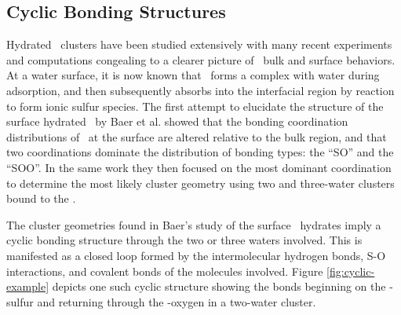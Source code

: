 \subsection {Cyclic Bonding Structures}

Hydrated \suldiox~clusters have been studied extensively with many recent experiments and computations congealing to a clearer picture of \suldiox~bulk and surface behaviors.\cite{Baer2010, Tarbuck2005, Tarbuck2006, Ota2011, Bishenden1998, Hirabayashi2006, Steudel2009, Yang2002, Hayashi1985, Moin2011, Eckl2008} At a water surface, it is now known that \suldiox~forms a complex with water during adsorption, and then subsequently absorbs into the interfacial region by reaction to form ionic sulfur species.\cite{Tarbuck2005, Tarbuck2006, Ota2011} The first attempt to elucidate the structure of the surface hydrated \suldiox~by Baer et al. showed that the bonding coordination distributions of \suldiox~at the surface are altered relative to the bulk region, and that two coordinations dominate the distribution of bonding types: the ``SO'' and the ``SOO''. In the same work they then focused on the most dominant coordination to determine the most likely cluster geometry using two and three-water clusters bound to the \suldiox.

The cluster geometries found in Baer's study of the surface \suldiox~hydrates imply a cyclic bonding structure through the two or three waters involved. This is manifested as a closed loop formed by the intermolecular hydrogen bonds, S-O interactions, and covalent bonds of the molecules involved. Figure \ref{fig:cyclic-example} depicts one such cyclic structure showing the bonds beginning on the \suldiox-sulfur and returning through the \suldiox-oxygen in a two-water cluster.

